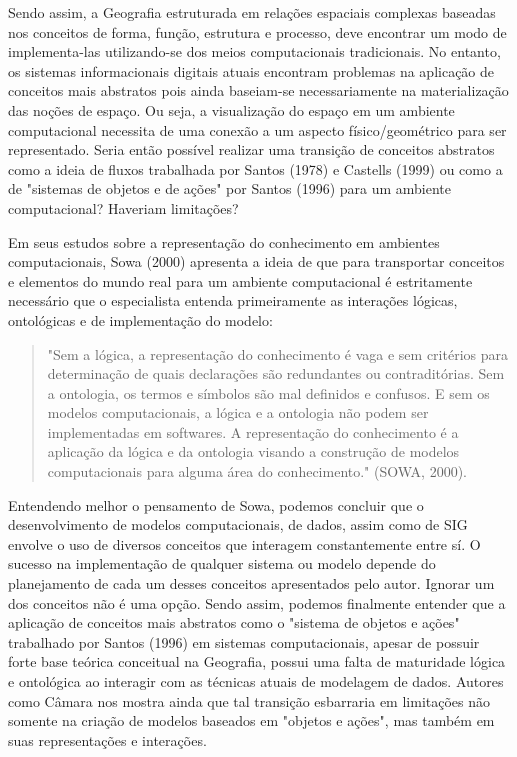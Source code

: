 Sendo assim, a Geografia estruturada em relações espaciais complexas baseadas nos conceitos de forma, função, estrutura e processo, deve encontrar um modo de implementa-las utilizando-se dos meios computacionais tradicionais. No entanto, os sistemas informacionais digitais atuais encontram problemas na aplicação de conceitos mais abstratos pois ainda baseiam-se necessariamente na materialização das noções de espaço. Ou seja, a visualização do espaço em um ambiente computacional necessita de uma conexão a um aspecto físico/geométrico para ser representado. Seria então possível realizar uma transição de conceitos abstratos como a ideia de fluxos trabalhada por Santos (1978) e Castells (1999) ou como a de "sistemas de objetos e de ações" por Santos (1996) para um ambiente computacional? Haveriam limitações?

Em seus estudos sobre a representação do conhecimento em ambientes computacionais, Sowa (2000) apresenta a ideia de que para transportar conceitos e elementos do mundo real para um ambiente computacional é estritamente necessário que o especialista entenda primeiramente as interações lógicas, ontológicas e de implementação do modelo:

	\begin{quote}
		"Sem a lógica, a representação do conhecimento é vaga e sem critérios para determinação de quais declarações são redundantes ou contraditórias. Sem a ontologia, os termos e símbolos são mal definidos e confusos. E sem os modelos computacionais, a lógica e a ontologia não podem ser implementadas em softwares. A representação do conhecimento é a aplicação da lógica e da ontologia visando a construção de modelos computacionais para alguma área do conhecimento." (SOWA, 2000).
	\end{quote}

Entendendo melhor o pensamento de Sowa, podemos concluir que o desenvolvimento de modelos computacionais, de dados, assim como de SIG envolve o uso de diversos conceitos que interagem constantemente entre sí. O sucesso na implementação de qualquer sistema ou modelo depende do planejamento de cada um desses conceitos apresentados pelo autor. Ignorar um dos conceitos não é uma opção. Sendo assim, podemos finalmente entender que a aplicação de conceitos mais abstratos como o "sistema de objetos e ações" trabalhado por Santos (1996)  em sistemas computacionais, apesar de possuir forte base teórica conceitual na Geografia, possui uma falta de maturidade lógica e ontológica ao interagir com as técnicas atuais de modelagem de dados. Autores como Câmara nos mostra ainda que tal transição esbarraria em limitações não somente na criação de modelos baseados em "objetos e ações", mas também em suas representações e interações.

